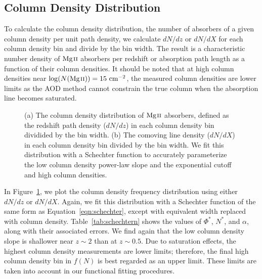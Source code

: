 \documentclass[iop,apj,numberedappendix,appendixfloats,twocolappendix]{emulateapj}
\begin{document}
\subsection{Column Density Distribution}
\label{sec:logndistro}

To calculate the column density distribution, the number of absorbers of a given column density per unit path density, we calculate $dN\!/dz$ or $dN\!/dX$ for each column density bin and divide by the bin width. The result is a characteristic number density of ${\hbox{{\rm Mg}\kern 0.1em{\sc ii}}}$ absorbers per redshift or absorption path length as a function of their column densities. It should be noted that at high column densities near $\log (N({\hbox{{\rm Mg}\kern 0.1em{\sc ii}}})) = 15~\mathrm{cm^{-2}}$, the measured column densities are lower limits as the AOD method cannot constrain the true column when the absorption line becomes saturated.

\begin{figure*}[bth]
\caption{(a) The column density distribution of ${\hbox{{\rm Mg}\kern 0.1em{\sc ii}}}$ absorbers, defined as the redshift path density ($dN\!/dz$) in each column density bin dividided by the bin width. (b) The comoving line density ($dN\!/dX$) in each column density bin divided by the bin width. We fit this distribution with a Schechter function to accurately parameterize the low column density power-law slope and the exponential cutoff and high column densities.}
\label{fig:logndistro}
\end{figure*}

In Figure~\ref{fig:logndistro}, we plot the column density frequency distribution using either $dN\!/dz$ or $dN\!/dX$. Again, we fit this distribution with a Schechter function of the same form as Equation~\ref{eqn:schechter}, except with equivalent width replaced with column density. Table~\ref{tab:schechtern} shows the values of $\Phi^*$, $N^*$, and $\alpha$, along with their associated errors. We find again that the low column density slope is shallower near $z \sim 2$ than at $z \sim 0.5$. Due to saturation effects, the highest column density measurements are lower limits; therefore, the final high column density bin in $f(N)$ is best regarded as an upper limit. These limits are taken into account in our functional fitting procedures.
\end{document}
